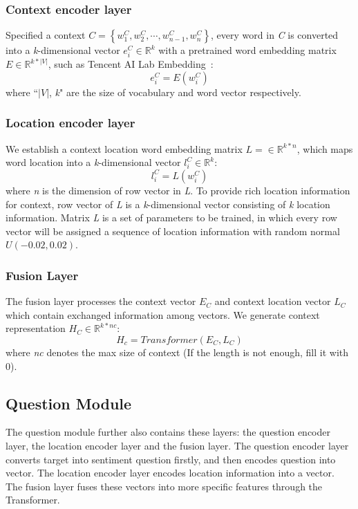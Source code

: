 \documentclass[runningheads, twocolumn]{llncs}
\begin{document}
\subsubsection{Context encoder layer}
Specified a context  $C = \left\{w_1^C, w_2^C, \cdots, w_{n-1}^C, w_n^C\right\}$, every word in \emph{C} is converted into a \emph{k}-dimensional vector $e_i^C \in \mathbb{R}^k$ with a pretrained word embedding matrix $E \in \mathbb{R}^{k\ast\left|V\right|}$, such as Tencent AI Lab Embedding~\cite{DBLP:conf/naacl/SongSLZ18}:
\begin{equation}
e_i^C = E(w_i^C)
\end{equation}
where “$\left|V\right|$, \emph{k}" are the size of vocabulary and word vector respectively.

\subsubsection{Location encoder layer}
We establish a context location word embedding matrix  $L = \in \mathbb{R}^{k\ast n}$, which maps word location into a \emph{k}-dimensional vector $l_i^C \in \mathbb{R}^k$:
\begin{equation}
	l_i^C = L(w_i^C)
\end{equation}
where \emph{n} is the dimension of row vector in \emph{L}. To provide rich location information for context, row vector of \emph{L} is a \emph{k}-dimensional vector consisting of \emph{k} location information. Matrix \emph{L} is a set of parameters to be trained, in which every row vector will be assigned a sequence of location information with random normal $U\left(-0.02, 0.02\right)$.

\subsubsection{Fusion Layer}
The fusion layer processes the context vector $E_C$ and context location vector $L_C$ which contain exchanged information among vectors. We generate context representation $H_C \in \mathbb{R}^{k\ast nc}$:
\begin{equation}
	H_c = Transformer(E_C, L_C)
\end{equation}
where \emph{nc} denotes the max size of context (If the length is not enough, fill it with 0).

\subsection{Question Module}
The question module further also contains these layers: the question encoder layer, the location encoder layer and the fusion layer. The question encoder layer converts target into sentiment question firstly, and then encodes question into vector. The location encoder layer encodes location information into a vector. The fusion layer fuses these vectors into more specific features through the Transformer.
\end{document}
